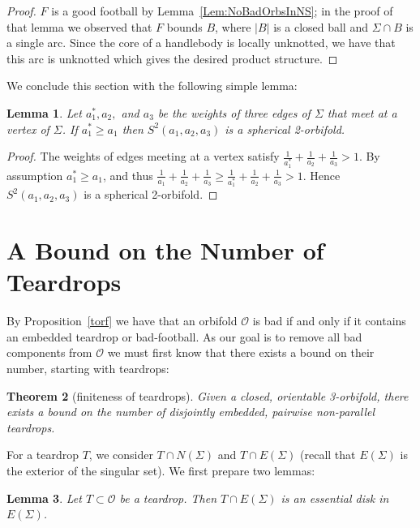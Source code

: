 \documentclass[12pt,reqno]{amsart}
\theoremstyle{plain}
\theoremstyle{definition}
\numberwithin{subcase}{case}
\theoremstyle{plain}
\newtheorem{thm}{Theorem}[section]  %
\newtheorem{lemm}[thm]{Lemma}
\theoremstyle{definition}
\newcommand{\OO}{\mathcal{O}}
\begin{document}
\begin{proof}
\(F\) is a good football by Lemma~\ref{Lem:NoBadOrbsInNS}; in the proof of that lemma we observed that \(F\) bounds \(B\), where \(|B|\) is a closed ball and \(\Sigma \cap B\) is a single arc.  Since the core of a handlebody is locally unknotted, we have that this arc is unknotted which gives the desired product structure.
\end{proof}

We conclude this section with the following simple lemma:
\begin{lemm}
Let $a_1^*,a_2,$ and $a_3$ be the weights of three edges of \(\Sigma\) that meet at a vertex of \(\Sigma\).
If \(a_{1}^{*} \geq a_{1}\) then $S^2(a_1,a_2,a_3)$ is a spherical 2-orbifold.
\label{firstcut}
\end{lemm}

\begin{proof}
The weights of edges meeting at a vertex satisfy $\frac{1}{a_1^*}+\frac{1}{a_2}+\frac{1}{a_3}>1$. By assumption $a_1^{*} \geq a_1$, and thus $\frac{1}{a_1}+\frac{1}{a_2}+\frac{1}{a_3} \geq \frac{1}{a_1^*}+\frac{1}{a_2}+\frac{1}{a_3} >1$. Hence  $S^2(a_1,a_2,a_3)$ is a spherical 2-orbifold.
\end{proof}


\section{A Bound on the Number of Teardrops}\label{sec:Teardrops are Bounded}
By Proposition~\ref{torf} we have that an orbifold $\OO$ is bad if and only if it contains an embedded teardrop or bad-football. As our goal is to remove all bad components from \(\OO\) we must first know that there exists a bound on their number, starting with teardrops:

\begin{thm}[finiteness of teardrops]
Given a closed, orientable 3-orbifold, there exists a bound on the number of disjointly embedded, pairwise non-parallel teardrops. 
\label{badbounded}
\end{thm}

For a teardrop \(T\), we consider \(T \cap N(\Sigma)\) and \(T \cap E(\Sigma)\)  (recall that \(E(\Sigma)\) is the exterior of the singular set). We first prepare two lemmas:

\begin{lemm}
Let \(T \subset \OO\) be a teardrop.  Then $T\cap E(\Sigma)$ is an essential disk in $E(\Sigma)$.
\label{prop1}
\end{lemm}
\end{document}
